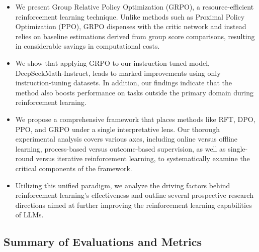 \begin{itemize}[topsep=0pt]
    \item We present Group Relative Policy Optimization (GRPO), a resource-efficient reinforcement learning technique. Unlike methods such as Proximal Policy Optimization (PPO), GRPO dispenses with the critic network and instead relies on baseline estimations derived from group score comparisons, resulting in considerable savings in computational costs.
    \item We show that applying GRPO to our instruction-tuned model, DeepSeekMath-Instruct, leads to marked improvements using only instruction-tuning datasets. In addition, our findings indicate that the method also boosts performance on tasks outside the primary domain during reinforcement learning.
    \item We propose a comprehensive framework that places methods like RFT, DPO, PPO, and GRPO under a single interpretative lens. Our thorough experimental analysis covers various axes, including online versus offline learning, process-based versus outcome-based supervision, as well as single-round versus iterative reinforcement learning, to systematically examine the critical components of the framework.
    \item Utilizing this unified paradigm, we analyze the driving factors behind reinforcement learning’s effectiveness and outline several prospective research directions aimed at further improving the reinforcement learning capabilities of LLMs.
\end{itemize}

\subsection{Summary of Evaluations and Metrics}

